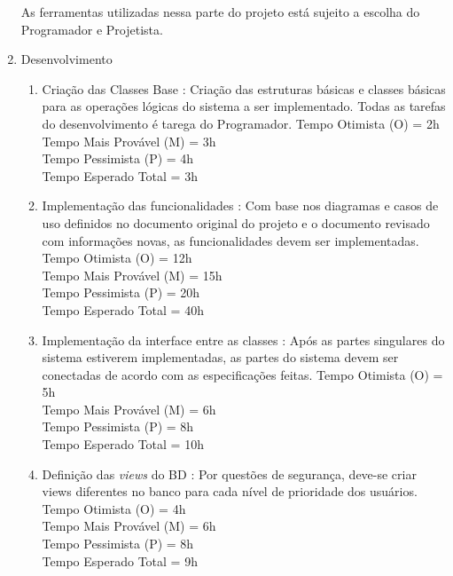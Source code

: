 \documentclass[12pt,a4paper,final]{article}
\begin{document}
\begin{enumerate}
As ferramentas utilizadas nessa parte do projeto está sujeito a escolha do Programador e Projetista.

\item Desenvolvimento
\begin{enumerate}

\item Criação das Classes Base : Criação das estruturas básicas e classes básicas para as operações lógicas do sistema a ser implementado. Todas as tarefas do desenvolvimento é tarega do Programador.
Tempo Otimista (O) = 2h\\
Tempo Mais Provável (M) = 3h\\
Tempo Pessimista (P) = 4h\\
Tempo Esperado Total = 3h

\item Implementação das funcionalidades : Com base nos diagramas e casos de uso definidos no documento original do projeto e o documento revisado com informações novas, as funcionalidades devem ser implementadas.
Tempo Otimista (O) = 12h\\
Tempo Mais Provável (M) = 15h\\
Tempo Pessimista (P) = 20h\\
Tempo Esperado Total = 40h

\item Implementação da interface entre as classes : Após as partes singulares do sistema estiverem implementadas, as partes do sistema devem ser conectadas de acordo com as especificações feitas.
Tempo Otimista (O) = 5h\\
Tempo Mais Provável (M) = 6h\\
Tempo Pessimista (P) = 8h\\
Tempo Esperado Total = 10h

\item Definição das \textit{views} do BD : Por questões de segurança, deve-se criar views diferentes no banco para cada nível de prioridade dos usuários.
Tempo Otimista (O) = 4h\\
Tempo Mais Provável (M) = 6h\\
Tempo Pessimista (P) = 8h\\
Tempo Esperado Total = 9h
\end{enumerate}


\end{enumerate}
\end{document}

